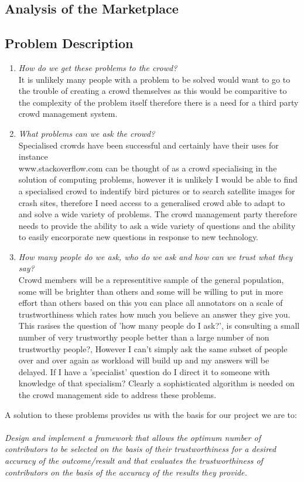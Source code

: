 \documentclass[11pt]{article}
\begin{document}
\subsection{Analysis of the Marketplace}

\subsection{Problem Description}
\begin{enumerate}
\item
\emph{How do we get these problems to the crowd?} 
\\
It is unlikely many people with a problem to be solved would want to go to the trouble
of creating a crowd themselves as this would be comparitive to the complexity of the problem itself therefore there is a need for a third party
crowd management system. 
\item
\emph{What problems can we ask the crowd?} 
\\
Specialised crowds have been successful and certainly have their uses for instance\\
www.stackoverflow.com can be thought of as a crowd specialising in the solution of computing problems, however it is unlikely I would
be able to find a specialised crowd to indentify bird pictures or to search satellite images for crash sites, therefore I need access 
to a generalised crowd able to adapt to and solve a wide variety of problems. The crowd management party therefore needs to provide
the ability to ask a wide variety of questions and the ability to easily encorporate new questions in response to new technology. %
\item
\emph{How many people do we ask, who do we ask and how can we trust what they say?} 
\\
Crowd members will be a representitive sample of the general 
population, some will be brighter than others and some will be willing to put in more effort than others based on this you can place all 
annotators on a scale of trustworthiness which rates how much you believe an answer they give you. This rasises the question of 'how many 
people do I ask?', is consulting a small number of very trustworthy people better than a large number of non trustworthy people?, However I 
can't simply ask the same subset of people over and over again as workload will build up and my answers will be delayed. If I have a 
'specialist' question do I direct it to someone with knowledge of that specialism? Clearly a sophisticated algorithm is needed on the crowd
management side to address these problems. 
\end{enumerate}
A solution to these problems provides us with the basis for our project we are to:
\\
\\
\emph{Design and implement a framework that allows the optimum number of contributors to be selected on the basis of their trustworthiness 
for a desired accuracy of the outcome/result and that evaluates the trustworthiness of contributors on the basis of the accuracy of the 
results they provide.}
\end{document}
